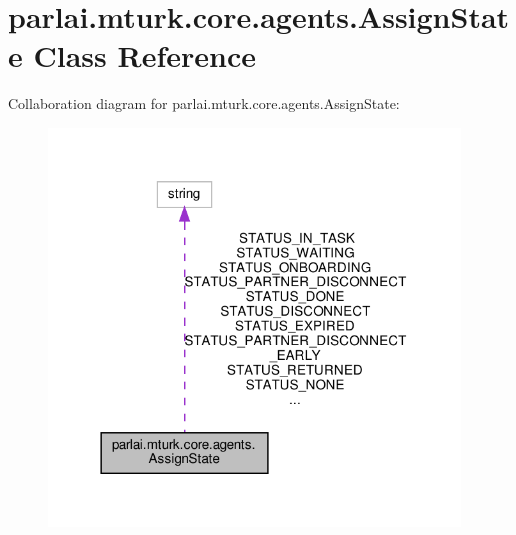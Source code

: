 \hypertarget{classparlai_1_1mturk_1_1core_1_1agents_1_1AssignState}{}\section{parlai.\+mturk.\+core.\+agents.\+Assign\+State Class Reference}
\label{classparlai_1_1mturk_1_1core_1_1agents_1_1AssignState}


Collaboration diagram for parlai.\+mturk.\+core.\+agents.\+Assign\+State\+:
\nopagebreak
\begin{figure}[H]
\begin{center}
\leavevmode
\includegraphics[width=310pt]{classparlai_1_1mturk_1_1core_1_1agents_1_1AssignState__coll__graph}
\end{center}
\end{figure}
